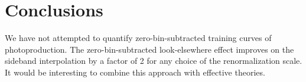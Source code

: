 \section{Conclusions}\label{sec:conclusions}

We have not attempted to quantify zero-bin-subtracted training curves of
photoproduction. The zero-bin-subtracted look-elsewhere effect improves
on the sideband interpolation by a factor of 2 for any choice of the
renormalization scale. It would be interesting to combine this approach
with effective theories.

